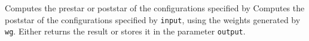 \begin{functionlist}
    Computes the prestar or poststar of the configurations specified by
    Computes the poststar of the configurations specified by
    \texttt{input}, using the weights generated by \texttt{wg}. Either
    returns the result or stores it in the parameter \texttt{output}.
\end{functionlist}

\clearpage
